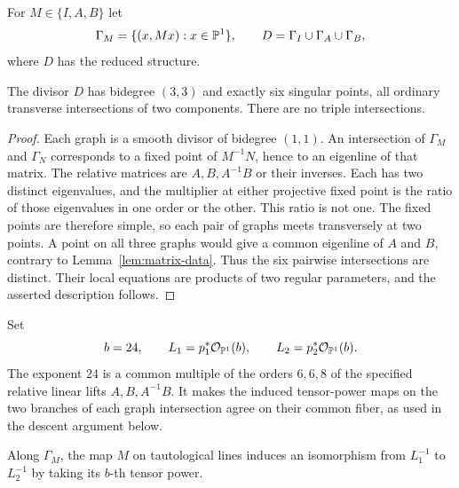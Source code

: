 For $M\in\{I,A,B\}$ let
\[
 \Gamma_M=\{(x,Mx):x\in\mathbb P^1\},\qquad
 D=\Gamma_I\cup\Gamma_A\cup\Gamma_B,
\]
where $D$ has the reduced structure.

\begin{lemma}\label{lem:graph-divisor}
The divisor $D$ has bidegree $(3,3)$ and exactly six singular points,
all ordinary transverse intersections of two components. There are
no triple intersections.
\end{lemma}

\begin{proof}
Each graph is a smooth divisor of bidegree $(1,1)$. An intersection
of $\Gamma_M$ and $\Gamma_N$ corresponds to a fixed point of
$M^{-1}N$, hence to an eigenline of that matrix. The relative
matrices are $A,B,A^{-1}B$ or their inverses. Each has two distinct
eigenvalues, and the multiplier at either projective fixed point is
the ratio of those eigenvalues in one order or the other. This
ratio is not one. The fixed points are therefore simple, so each
pair of graphs meets transversely at two points. A point on all
three graphs would give a common eigenline of $A$ and $B$, contrary
to Lemma~\ref{lem:matrix-data}. Thus the six pairwise intersections
are distinct. Their local equations are products of two regular
parameters, and the asserted description follows.
\end{proof}

Set
\begin{equation}\label{eq:construction-lines}
 b=24,\qquad L_1=p_1^*\mathcal O_{\mathbb P^1}(b),\qquad
 L_2=p_2^*\mathcal O_{\mathbb P^1}(b).
\end{equation}
The exponent $24$ is a common multiple of the orders $6,6,8$ of
the specified relative linear lifts $A,B,A^{-1}B$. It makes the
induced tensor-power maps on the two branches of each graph
intersection agree on their common fiber, as used in the descent
argument below.

Along $\Gamma_M$, the map $M$ on tautological lines induces an
isomorphism from $L_1^{-1}$ to $L_2^{-1}$ by taking its $b$-th
tensor power.

